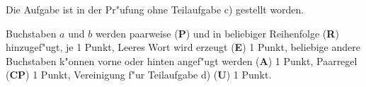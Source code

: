 \begin{diskussion}
Die Aufgabe ist in der Pr"ufung ohne Teilaufgabe c) gestellt worden.
\end{diskussion}

\begin{bewertung}
Buchstaben $a$ und $b$ werden paarweise ({\bf P}) und in beliebiger
Reihenfolge ({\bf R}) hinzugef"ugt, je 1 Punkt,
Leeres Wort wird erzeugt ({\bf E}) 1 Punkt,
beliebige andere Buchstaben k"onnen vorne oder hinten angef"ugt werden
({\bf A}) 1 Punkt,
Paarregel ({\bf CP}) 1 Punkt,
Vereinigung f"ur Teilaufgabe d) ({\bf U}) 1 Punkt.
\end{bewertung}



